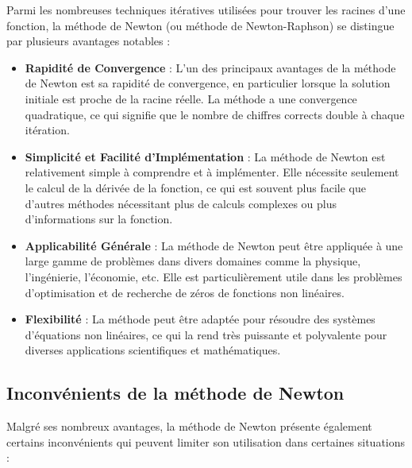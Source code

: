 \documentclass{article}
\begin{document}
Parmi les nombreuses techniques itératives utilisées pour trouver les racines d'une fonction, la méthode de Newton (ou méthode de Newton-Raphson) se distingue par plusieurs avantages notables :

\begin{itemize}
    \item \textbf{Rapidité de Convergence} : L'un des principaux avantages de la méthode de Newton est sa rapidité de convergence, en particulier lorsque la solution initiale est proche de la racine réelle. La méthode a une convergence quadratique, ce qui signifie que le nombre de chiffres corrects double à chaque itération.
    \item \textbf{Simplicité et Facilité d'Implémentation} : La méthode de Newton est relativement simple à comprendre et à implémenter. Elle nécessite seulement le calcul de la dérivée de la fonction, ce qui est souvent plus facile que d'autres méthodes nécessitant plus de calculs complexes ou plus d'informations sur la fonction.
    \item \textbf{Applicabilité Générale} : La méthode de Newton peut être appliquée à une large gamme de problèmes dans divers domaines comme la physique, l'ingénierie, l'économie, etc. Elle est particulièrement utile dans les problèmes d'optimisation et de recherche de zéros de fonctions non linéaires.
    \item \textbf{Flexibilité} : La méthode peut être adaptée pour résoudre des systèmes d'équations non linéaires, ce qui la rend très puissante et polyvalente pour diverses applications scientifiques et mathématiques.
\end{itemize}

\subsection{Inconvénients de la méthode de Newton}

Malgré ses nombreux avantages, la méthode de Newton présente également certains inconvénients qui peuvent limiter son utilisation dans certaines situations :
\end{document}
